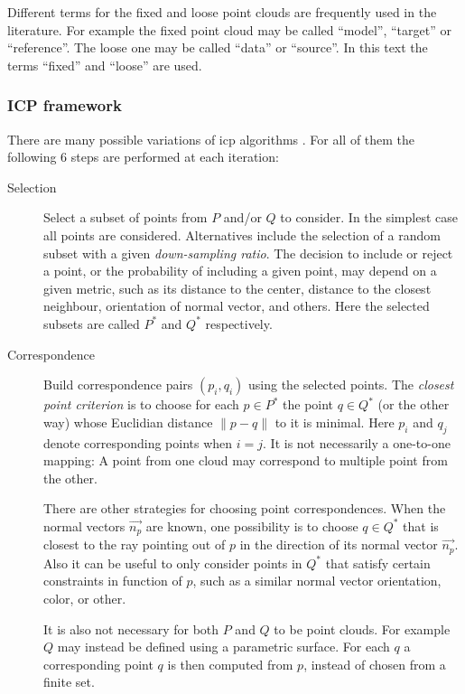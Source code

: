 Different terms for the fixed and loose point clouds are frequently used in the literature. For example the fixed point cloud may be called ``model'', ``target'' or ``reference''. The loose one may be called ``data'' or ``source''. In this text the terms ``fixed'' and ``loose'' are used.

\subsubsection{ICP framework}
There are many possible variations of \gls{icp} algorithms \cite{Rusi2001}. For all of them the following 6 steps are performed at each iteration:
\begin{description}
\item[Selection] Select a subset of points from $P$ and/or $Q$ to consider. In the simplest case all points are considered. Alternatives include the selection of a random subset with a given \emph{down-sampling ratio}. The decision to include or reject a point, or the probability of including a given point, may depend on a given metric, such as its distance to the center, distance to the closest neighbour, orientation of normal vector, and others. Here the selected subsets are called $P^*$ and $Q^*$ respectively.
\item[Correspondence] Build correspondence pairs $(p_i, q_i)$ using the selected points. The \emph{closest point criterion} is to choose for each $p \in P^*$ the point $q \in Q^*$ (or the other way) whose Euclidian distance $\|p - q\|$ to it is minimal. Here $p_i$ and $q_j$ denote corresponding points when $i = j$. It is not necessarily a one-to-one mapping: A point from one cloud may correspond to multiple point from the other.

There are other strategies for choosing point correspondences. When the normal vectors $\vec{n_p}$ are known, one possibility is to choose $q \in Q^*$ that is closest to the ray pointing out of $p$ in the direction of its normal vector $\vec{n_p}$. Also it can be useful to only consider points in $Q^*$ that satisfy certain constraints in function of $p$, such as a similar normal vector orientation, color, or other.

It is also not necessary for both $P$ and $Q$ to be point clouds. For example $Q$ may instead be defined using a parametric surface. For each $q$ a corresponding point $q$ is then computed from $p$, instead of chosen from a finite set.


\end{description}
